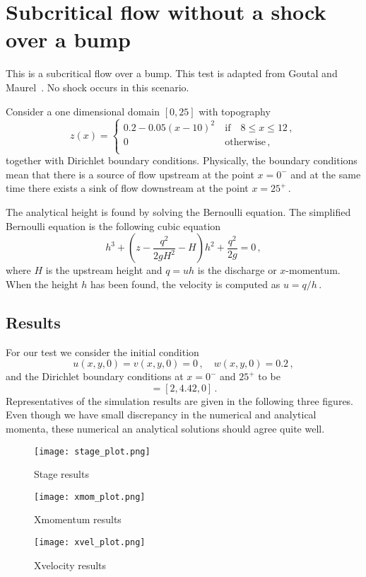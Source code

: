 
\section{Subcritical flow without a shock over a bump}

This is a subcritical flow over a bump. This test is adapted from Goutal and Maurel~\cite{GM1997}. No shock occurs in this scenario. 

Consider a one dimensional domain $[0,25]$ with topography
\begin{equation}
z(x)= \left\{ \begin{array}{ll}
 0.2-0.05\left(x-10\right)^2& ~\textrm{if}\quad 8 \leq x \leq 12\,,\\
 0 & ~\textrm{otherwise}\,,\\
\end{array} \right.
\end{equation}
together with Dirichlet boundary conditions.
Physically, the boundary conditions mean that there is a source of flow upstream at the point $x=0^{-}$ and at the same time there exists a sink of flow downstream at the point $x=25^{+}$\,.


The analytical height is found by solving the Bernoulli equation. The simplified Bernoulli equation is the following cubic equation
\begin{equation}
h^3 + \left(z - \frac{q^2}{2 g H^2} - H \right) h^2 + \frac{q^2}{2 g} = 0\,,
\end{equation}
where $H$ is the upstream height and $q=uh$ is the discharge or $x$-momentum. When the height $h$ has been found, the velocity is computed as $u=q/h$\,.

\subsection{Results}
For our test we consider the initial condition
\begin{equation}
u(x,y,0)=v(x,y,0)=0\,, \quad
w(x,y,0)= 0.2\,,
\end{equation}
and the Dirichlet boundary conditions at $x=0^{-}$ and $25^{+}$ to be 
\begin{equation}
[w,hu,hv]=[2, 4.42, 0]\,.
\end{equation}
Representatives of the simulation results are given in the following three figures. Even though we have small discrepancy in the numerical and analytical momenta, these numerical an analytical solutions should agree quite well.

\begin{figure}
\begin{center}
\texttt{[image: stage\_plot.png]}
\end{center}
\caption{Stage results}
\end{figure}


\begin{figure}
\begin{center}
\texttt{[image: xmom\_plot.png]}
\end{center}
\caption{Xmomentum results}
\end{figure}


\begin{figure}
\begin{center}
\texttt{[image: xvel\_plot.png]}
\end{center}
\caption{Xvelocity results}
\end{figure}


\endinput
